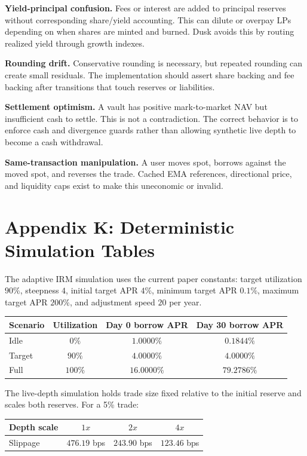 \documentclass[11pt]{article}
\begin{document}
\textbf{Yield-principal confusion.} Fees or interest are added to principal reserves without corresponding share/yield accounting. This can dilute or overpay LPs depending on when shares are minted and burned. Dusk avoids this by routing realized yield through growth indexes.

\textbf{Rounding drift.} Conservative rounding is necessary, but repeated rounding can create small residuals. The implementation should assert share backing and fee backing after transitions that touch reserves or liabilities.

\textbf{Settlement optimism.} A vault has positive mark-to-market NAV but insufficient cash to settle. This is not a contradiction. The correct behavior is to enforce cash and divergence guards rather than allowing synthetic live depth to become a cash withdrawal.

\textbf{Same-transaction manipulation.} A user moves spot, borrows against the moved spot, and reverses the trade. Cached EMA references, directional price, and liquidity caps exist to make this uneconomic or invalid.

\section{Appendix K: Deterministic Simulation Tables}

The adaptive IRM simulation uses the current paper constants: target utilization $90\%$, steepness $4$, initial target APR $4\%$, minimum target APR $0.1\%$, maximum target APR $200\%$, and adjustment speed $20$ per year.

\begin{center}
\begin{tabular}{lccc}
\toprule
Scenario & Utilization & Day 0 borrow APR & Day 30 borrow APR \\
\midrule
Idle & $0\%$ & $1.0000\%$ & $0.1844\%$ \\
Target & $90\%$ & $4.0000\%$ & $4.0000\%$ \\
Full & $100\%$ & $16.0000\%$ & $79.2786\%$ \\
\bottomrule
\end{tabular}
\end{center}

The live-depth simulation holds trade size fixed relative to the initial reserve and scales both reserves. For a 5\% trade:
\begin{center}
\begin{tabular}{lccc}
\toprule
Depth scale & $1x$ & $2x$ & $4x$ \\
\midrule
Slippage & $476.19$ bps & $243.90$ bps & $123.46$ bps \\
\bottomrule
\end{tabular}
\end{center}
\end{document}
